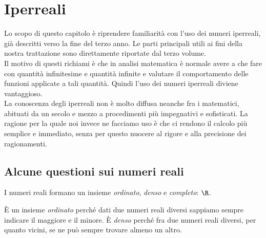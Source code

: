 

% 

\chapter{Iperreali}
\label{sec:01_introduzione}
Lo scopo di questo capitolo è riprendere familiarità con l'uso 
dei numeri iperreali, già descritti verso la fine del terzo anno. 
Le parti principali utili ai fini della nostra trattazione sono 
direttamente riportate dal terzo volume.\\
Il motivo di questi richiami è che in analisi matematica è normale 
avere a che fare con quantità infinitesime e quantità infinite e 
valutare il comportamento delle funzioni applicate a tali quantità. 
Quindi l'uso dei numeri iperreali diviene vantaggioso.\\
La conoscenza degli iperreali non è molto diffusa neanche fra i matematici, 
abituati da un secolo e mezzo a procedimenti più impegnativi e sofisticati.
La ragione per la quale noi invece ne facciamo uso è che ci rendono il 
calcolo 
più semplice e immediato, senza per questo nuocere al rigore e alla 
precisione dei ragionamenti.

\section{Alcune questioni sui numeri reali}
\label{sec:insnum_reali}

I numeri reali formano un insieme \emph{ordinato}, \emph{denso} e 
\emph{completo}: \(\R\). 

È un insieme \emph{ordinato} perché dati due numeri reali diversi sappiamo 
sempre indicare il maggiore e il minore. 
È \emph{denso} perché fra due numeri reali diversi, per quanto vicini, se ne 
può sempre trovare almeno un altro. 


